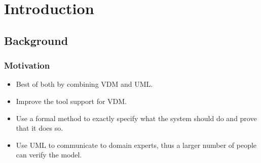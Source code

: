%
%
\section{Introduction}

\subsection{Background}

%
%
\frame
{
 \frametitle{Motivation}
  \begin{itemize}[<+->]
\itemsep=1cm
  \item<1-> Best of both by combining VDM and UML.
  \item<2-> Improve the tool support for VDM.
  \end{itemize}
}
%
%
%

\note
{

  \begin{itemize}
  		\item Use a formal method to exactly specify what the system should do and prove that it does so.
  		\item Use UML to communicate to domain experts, thus a larger number of people can verify the model.
  		
  \end{itemize}



}

